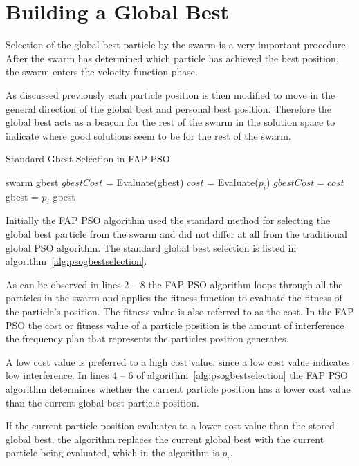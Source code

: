 \section{Building a Global Best}
\label{sec:buildglobalbest}
Selection of the global best particle by the swarm is a very important procedure. After the swarm has determined which particle has achieved the best position, the swarm enters the velocity function phase. 

As discussed previously each particle position is then modified to move in the general direction of the global best and personal best position. Therefore the global best acts as a beacon for the rest of the swarm in the solution space to indicate where good solutions seem to be for the rest of the swarm.

\begin{algorithm}
\caption{Standard Gbest Selection in FAP PSO}
\label{alg:psogbestselection}
\begin{algorithmic}[1]
\Require swarm
\Require gbest
\State $gbestCost$ = Evaluate(gbest)
	\State $cost$ = Evaluate($p_i$)
		\State $gbestCost = cost$
		\State gbest = $p_i$
	\EndIf
\EndFor
\Return gbest
\end{algorithmic}
\end{algorithm}

Initially the FAP PSO algorithm used the standard method for selecting the global best particle from the swarm and did not differ at all from the traditional global PSO algorithm. The standard global best selection is listed in algorithm~\ref{alg:psogbestselection}. 

As can be observed in lines 2 -- 8 the FAP PSO algorithm loops through all the particles in the swarm and applies the fitness function to evaluate the fitness of the particle's position. The fitness value is also referred to as the cost. In the FAP PSO the cost or fitness value of a particle position is the amount of interference the frequency plan that represents the particles position generates.

A low cost value is preferred to a high cost value, since a low cost value indicates low interference. In lines 4 -- 6 of algorithm~\ref{alg:psogbestselection} the FAP PSO algorithm determines whether the current particle position has a lower cost value than the current global best particle position.

If the current particle position evaluates to a lower cost value than the stored global best, the algorithm replaces the current global best with the current particle being evaluated, which in the algorithm is $p_i$.


